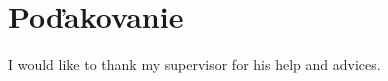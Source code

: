 \chapter{Poďakovanie}
\vfil
I would like to thank my supervisor \supervisor for his help and advices.
